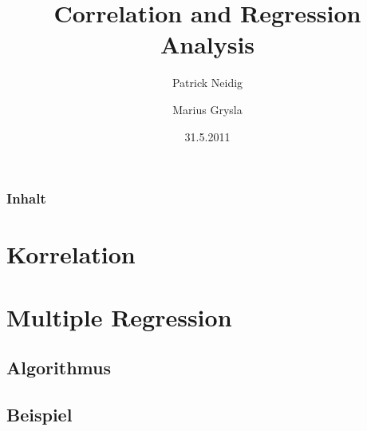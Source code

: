 \documentclass{beamer}
\begin{document}
\title{Correlation and Regression Analysis}
\author{Patrick Neidig \and Marius Grysla}
\date{31.5.2011}
\frame{\titlepage}

\begin{frame}
 \frametitle{Inhalt}
 \tableofcontents
\end{frame}

\section{Korrelation}
\begin{frame}
 
\end{frame}


\section{Multiple Regression}
\begin{frame}
 
\end{frame}

\subsection{Algorithmus}
\begin{frame}
 
\end{frame}

\subsection{Beispiel}
\begin{frame}
 
\end{frame}
\end{document}

